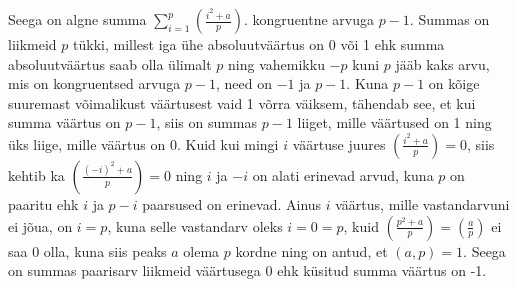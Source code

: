 \documentclass[a4paper, 10pt]{article}
\newcommand{\leg}[2]{\left(\frac{#1}{#2}\right)}
\begin{document}
Seega on algne summa $\sum\limits_{i=1}^{p}\left(\frac{i^2+a}{p}\right).$ kongruentne arvuga $p-1$. Summas on liikmeid $p$ tükki, millest iga ühe absoluutväärtus on 0 või 1 ehk summa absoluutväärtus saab olla ülimalt $p$ ning vahemikku $-p$ kuni $p$ jääb kaks arvu, mis on kongruentsed arvuga $p-1$, need on $-1$ ja $p-1$. Kuna $p-1$ on kõige suuremast võimalikust väärtusest vaid 1 võrra väiksem, tähendab see, et kui summa väärtus on $p-1$, siis on summas $p-1$ liiget, mille väärtused on 1 ning üks liige, mille väärtus on 0. Kuid kui mingi $i$ väärtuse juures $\leg{i^2+a}{p}=0$, siis kehtib ka $\leg{(-i)^2+a}{p}=0$ ning $i$ ja $-i$ on alati erinevad arvud, kuna $p$ on paaritu ehk $i$ ja $p-i$ paarsused on erinevad. Ainus $i$ väärtus, mille vastandarvuni ei jõua, on $i=p$, kuna selle vastandarv oleks $i=0=p$, kuid $\leg{p^2+a}{p}=\leg{a}{p}$ ei saa 0 olla, kuna siis peaks $a$ olema $p$ kordne ning on antud, et $(a,p)=1$. Seega on summas paarisarv liikmeid väärtusega 0 ehk küsitud summa väärtus on -1.
\bigskip
\end{document}

